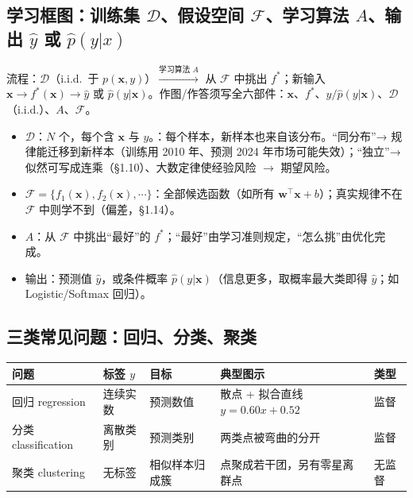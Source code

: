 \subsection{学习框图：训练集 \texorpdfstring{$\mathcal D$}{D}、假设空间 \texorpdfstring{$\mathcal F$}{F}、学习算法 \texorpdfstring{$A$}{A}、输出 \texorpdfstring{$\hat y$}{y-hat} 或 \texorpdfstring{$\hat p(y|x)$}{p(y|x)}}
流程：$\mathcal D$（i.i.d.\ 于 $p(\bm x,y)$）$\xrightarrow{\text{学习算法 }A}$ 从 $\mathcal F$ 中挑出 $f^*$；新输入 $\bm x\to f^*(\bm x)\to\hat y$ 或 $\hat p(y|\bm x)$。作图/作答须写全六部件：$\bm x$、$f^*$、$\hat y/\hat p(y|\bm x)$、$\mathcal D$（i.i.d.）、$A$、$\mathcal F$。
\begin{itemize}
\item {} $\mathcal D$：$N$ 个，每个含 $\bm x$ 与 $y$。：每个样本，新样本也来自该分布。“同分布”→ 规律能迁移到新样本（训练用 2010 年、预测 2024 年市场可能失效）；“独立”→ 似然可写成连乘（§1.10）、大数定律使经验风险 $\to$ 期望风险。
\item {} $\mathcal F=\{f_1(\bm x),f_2(\bm x),\cdots\}$：全部候选函数（如所有 $\bm w^\top\bm x+b$）；真实规律不在 $\mathcal F$ 中则学不到（偏差，§1.14）。
\item {} $A$：从 $\mathcal F$ 中挑出“最好”的 $f^*$；“最好”由学习准则规定，“怎么挑”由优化完成。
\item 输出：预测值 $\hat y$，或条件概率 $\hat p(y|\bm x)$（信息更多，取概率最大类即得 $\hat y$；如 Logistic/Softmax 回归）。
\end{itemize}

\subsection{三类常见问题：回归、分类、聚类}
\begin{center}\small
\begin{tabularx}{\linewidth}{@{}p{2.7cm}p{1.6cm}p{2.9cm}Lp{1.2cm}@{}}
\toprule
问题 & 标签 $y$ & 目标 & 典型图示 & 类型 \\
\midrule
回归 regression & 连续实数 & 预测数值 & 散点 + 拟合直线 $y=0.60x+0.52$ & 监督 \\
分类 classification & 离散类别 & 预测类别 & 两类点被弯曲的分开 & 监督 \\
聚类 clustering & 无标签 & 相似样本归成簇 & 点聚成若干团，另有零星离群点 & 无监督 \\
\bottomrule
\end{tabularx}
\end{center}

